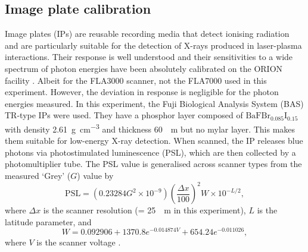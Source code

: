 \subsection{Image plate calibration}
Image plates (IPs) are reusable recording media that detect ionising radiation and are particularly suitable for the detection of X-rays produced in laser-plasma interactions. Their response is well understood and their sensitivities to a wide spectrum of photon energies have been absolutely calibrated on the ORION facility \cite{meadowcroftEvaluationSensitivityFading2008}. Albeit for the FLA3000 scanner, not the FLA7000 used in this experiment. However, the deviation in response is negligible for the photon energies measured. In this experiment, the Fuji Biological Analysis System (BAS) TR-type IPs were used. They have a phosphor layer composed of $\mathrm{BaFBr_{0.085}I_{0.15}}$ with density \qty{2.61}{g.cm^{-3}} and thickness \qty{60}{\mu m} but no mylar layer. This makes them suitable for low-energy X-ray detection. When scanned, the IP releases blue photons via photostimulated luminescence (PSL), which are then collected by a photomultiplier tube. The PSL value is generalised across scanner types from the measured `Grey' ($G$) value by
\begin{equation}
	\mathrm{PSL} = (0.23284G^2\times 10^{-9})\left(\frac{\Delta x}{100}\right)^2W\times 10^{-L/2},
\end{equation}
where $\Delta x$ is the scanner resolution (= \qty{25}{\mu m} in this experiment), $L$ is the latitude parameter, and
\begin{equation}
	W = 0.092906 + 1370.8e^{-0.014874V} +  654.24e^{-0.011026},
\end{equation}
where $V$ is the scanner voltage \cite{golovinCalibrationImagingPlates2021}.

